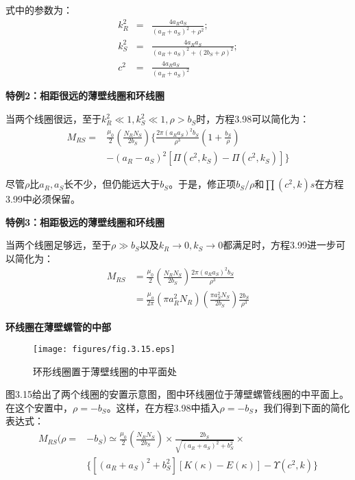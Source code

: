 式中的参数为：
\begin{eqnarray}
k_R^2&=&\frac{4a_Ra_S}{(a_R+a_S)^2+\rho^2};\\
k_S^2&=&\frac{4a_Ra_S}{(a_R+a_S)^2+(2b_S+\rho)^2};\\
c^2&=&\frac{4a_Ra_S}{(a_R+a_S)^2}%
\end{eqnarray}

\textbf{特例2：相距很远的薄壁线圈和环线圈} 

  当两个线圈很远，至于$k_R^2 \ll 1, k_S^2\ll 1,\rho > b_S$时，方程3.98可以简化为：
  \begin{equation}
  \begin{split}
M_{RS}=&\frac{\mu_0}{2}(\frac{N_RN_S}{2b_S})\{\frac{2\pi(a_Ra_S)^2b_S}{\rho^3}(1+\frac{b_S}{\rho})\\
&-(a_R-a_S)^2[\Pi(c^2,k_S)-\Pi(c^2,k_S)]\}%
  \end{split}
  \end{equation}
  
尽管$\rho$比$a_R,a_S$长不少，但仍能远大于$b_S$。于是，修正项$b_S/\rho$和$\prod(c^2, k)s$在方程3.99中必须保留。

\textbf{特例3：相距极远的薄壁线圈和环线圈} 

  当两个线圈足够远，至于$\rho \gg b_S$以及$k_R\rightarrow 0,k_S\rightarrow 0$都满足时，方程3.99进一步可以简化为：
 \begin{equation}
\begin{split}
M_{RS}&=\frac{\mu_0}{2}(\frac{N_RN_S}{2b_S})\frac{2\pi(a_Ra_S)^2b_S}{\rho^3}\\
&=\frac{\mu_o}{2\pi}(\pi a_R^2N_R)(\frac{\pi a_S^2N_S}{2b_S})\frac{2b_S}{\rho^3}%
\end{split}
\end{equation}

\textbf{环线圈在薄壁螺管的中部} 
\begin{figure}[htbp]
	\centering
	\texttt{[image: figures/fig.3.15.eps]}
	\caption{环形线圈置于薄壁线圈的中平面处}
\end{figure}

图3.15给出了两个线圈的安置示意图，图中环线圈位于薄壁螺管线圈的中平面上。在这个安置中，$\rho=-b_S$。这样，在方程3.98中插入$\rho=-b_S$，我们得到下面的简化表达式：
  \begin{equation}
  \begin{split}
M_{RS}(\rho=&-b_S)\simeq\frac{\mu_0}{2}(\frac{N_R N_S}{2b_S})\times\frac{2b_S}{\sqrt{(a_R+a_S)^2+b_S^2}}\times\\
&\{[(a_R+a_S)^2+b_S^2][K(\kappa)-E(\kappa)]-\Upsilon(c^2,k)\}%
\end{split}
\end{equation}

